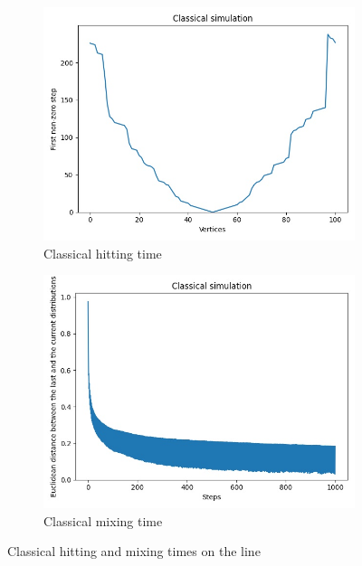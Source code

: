 \begin{figure}[H]
  \centering
  \begin{subfigure}{.45\linewidth}
    \centering
    \includegraphics[width=\linewidth]{./figures/results/path/classical_hitting_time.jpg}
    \caption{Classical hitting time}
  \end{subfigure}
  \begin{subfigure}{.45\linewidth}
    \centering
    \includegraphics[width=\linewidth]{./figures/results/path/classical_mixing_time.jpg}
    \caption{Classical mixing time}
  \end{subfigure}
  \caption{Classical hitting and mixing times on the line}
\end{figure}

